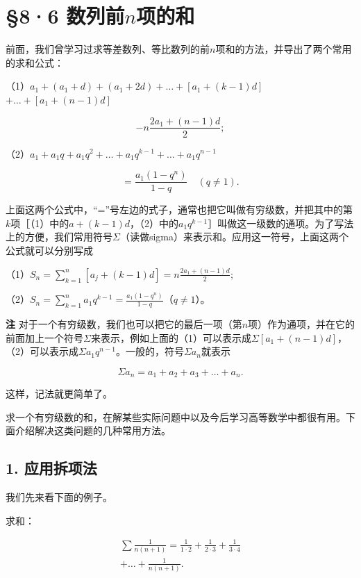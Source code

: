 \section{\texorpdfstring{§8·6 数列前\(n\)项的和}{§8·6 数列前n项的和}}

前面，我们曾学习过求等差数列、等比数列的前\(n\)项和的方法，并导出了两个常用的求和公式：

（1）\(a_{1} + (a_{1} + d) + (a_{1} + 2d) + \dots + [a_{1} + (k - 1)d]\)\(+\dots +[a_1 + (n - 1)d]\)

\[
- n \frac{2 a_{1} + (n - 1) d}{2};
\]

（2）\(a_{1} + a_{1}q + a_{1}q^{2} + \dots +a_{1}q^{k - 1} + \dots +a_{1}q^{n - 1}\)

\[
= \frac{a_{1} (1 - q^{n})}{1 - q} \quad (q \neq 1).
\]

上面这两个公式中，``=''号左边的式子，通常也把它叫做有穷级数，并把其中的第\(k\)项［（1）中的\(a + (k - 1)d\)，（2）中的\(a_1q^{k - 1}\)］叫做这一级数的通项。为了写法上的方便，我们常用符号\(\Sigma\)（读做sigma）来表示和。应用这一符号，上面这两个公式就可以分别写成

（1）\(S_{n} = \sum_{k=1}^{n} [a_{j} + (k-1)d] = n \frac{2a_{1} + (n-1)d}{2};\)

（2）\(S_{n} = \sum_{k=1}^{n} a_{1} q^{k-1} = \frac{a_{1}(1 - q^{n})}{1 - q}\)（\(q \neq 1\)）。

\textbf{注}
对于一个有穷级数，我们也可以把它的最后一项（第\(n\)项）作为通项，并在它的前面加上一个符号\(\Sigma\)来表示，例如上面的（1）可以表示成\(\Sigma [a_1 + (n - 1)d]\)，（2）可以表示成\(\Sigma a_1q^{n - 1}\)。一般的，符号\(\Sigma a_{n}\)就表示

\[
\Sigma a_{n} = a_{1} + a_{2} + a_{3} + \dots + a_{n}.
\]

这样，记法就更简单了。

求一个有穷级数的和，在解某些实际问题中以及今后学习高等数学中都很有用。下面介绍解决这类问题的几种常用方法。

\subsection{1. 应用拆项法}

我们先来看下面的例子。

求和：

\[
\begin{array}{l} \sum \frac{1}{n (n + 1)} = \frac{1}{1 \cdot 2} + \frac{1}{2 \cdot 3} + \frac{1}{3 \cdot 4} \\ + \dots + \frac{1}{n (n + 1)}. \\ \end{array}
\]

